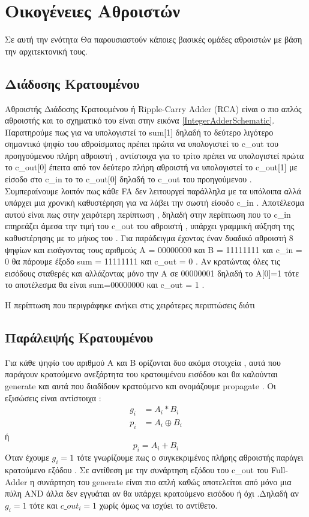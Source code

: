 \section{Οικογένειες Αθροιστών}
Σε αυτή την ενότητα Θα παρουσιαστούν κάποιες βασικές ομάδες αθροιστών με βάση την αρχιτεκτονική τους.


\subsection{Διάδοσης Κρατουμένου}
Αθροιστής Διάδοσης Κρατουμένου ή Ripple-Carry Adder (RCA) είναι ο πιο απλός αθροιστής και το σχηματικό του είναι στην εικόνα \ref{IntegerAdderSchematic}. Παρατηρούμε πως για να υπολογιστεί το sum[1] δηλαδή το δεύτερο λιγότερο σημαντικό ψηφίο του αθροίσματος πρέπει πρώτα να υπολογιστεί το c\_out του προηγούμενου πλήρη αθροιστή , αντίστοιχα για το τρίτο πρέπει να υπολογιστεί πρώτα το c\_out[0] έπειτα από τον δεύτερο πλήρη αθροιστή να υπολογιστεί το c\_out[1] με είσοδο στο c\_in το το c\_out[0] δηλαδή το c\_out του προηγούμενου . Συμπεραίνουμε λοιπόν πως κάθε FA δεν λειτουργεί παράλληλα με τα υπόλοιπα αλλά υπάρχει μια χρονική καθυστέρηση για να λάβει την σωστή είσοδο c\_in . Αποτέλεσμα αυτού είναι πως στην χειρότερη περίπτωση , δηλαδή στην περίπτωση που το c\_in επηρεάζει άμεσα την τιμή του c\_out του αθροιστή , υπάρχει γραμμική αύξηση της καθυστέρησης με το μήκος του .
Για παράδειγμα έχοντας έναν δυαδικό αθροιστή 8 ψηφίων και εισάγοντας τους αριθμούς Α = 00000000 και Β = 11111111 και c\_in = 0 θα πάρουμε έξοδο sum = 11111111 και c\_out = 0 . Αν κρατώντας όλες τις εισόδους σταθερές και αλλάζοντας μόνο την Α σε 00000001 δηλαδή το Α[0]=1 τότε το αποτέλεσμα θα είναι sum=00000000 και c\_out = 1 . 
\par
Η περίπτωση που περιγράφηκε ανήκει στις χειρότερες περιπτώσεις διότι 


\subsection{Παράλειψής Κρατουμένου}
Για κάθε ψηφίο του αριθμού Α και Β ορίζονται δυο ακόμα στοιχεία , αυτά που παράγουν κρατούμενο ανεξάρτητα του κρατουμένου εισόδου και θα καλούνται generate και αυτά που διαδίδουν κρατούμενο και ονομάζουμε propagate . Οι εξισώσεις είναι αντίστοιχα :
\begin{equation}
\begin{split}
    g_i &= A_i * B_i  \\
    p_i &= A_i \oplus B_i 
\end{split}
\end{equation}
ή
\begin{equation*}
    p_i = A_i + B_i
\end{equation*}
Όταν έχουμε $g_i=1$ τότε γνωρίζουμε πως ο συγκεκριμένος πλήρης αθροιστής παράγει κρατούμενο εξόδου . Σε αντίθεση με την συνάρτηση εξόδου του c\_out του Full-Adder η συνάρτηση του generate είναι πιο απλή καθώς αποτελείται από μόνο μια πύλη AND άλλα δεν εγγυάται αν θα υπάρχει κρατούμενο εισόδου ή όχι .Δηλαδή αν $g_i=1$ τότε και $c\_out_i=1$ χωρίς όμως να ισχύει το αντίθετο. 

